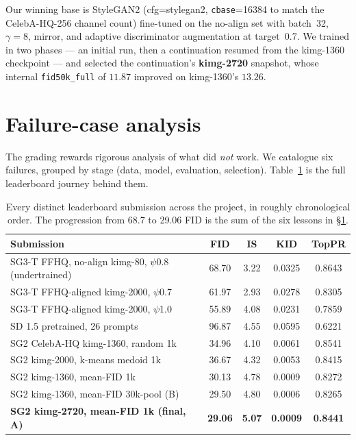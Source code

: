 \documentclass{article}
\begin{document}
Our winning base is StyleGAN2 \citep{karras2020analyzing} (cfg=stylegan2,
\texttt{cbase}=16384 to match the CelebA-HQ-256 channel count) fine-tuned on the
no-align set with batch~32, $\gamma{=}8$, mirror, and adaptive discriminator
augmentation \citep{karras2020training} at target~0.7. We trained in two phases --- an
initial run, then a continuation resumed from the kimg-1360 checkpoint --- and
selected the continuation's \textbf{kimg-2720} snapshot, whose internal
\texttt{fid50k\_full} of $11.87$ improved on kimg-1360's $13.26$.

\section{Failure-case analysis}
\label{sec:failures}
The grading rewards rigorous analysis of what did \emph{not} work. We catalogue
six failures, grouped by stage (data, model, evaluation, selection).
Table~\ref{tab:journey} is the full leaderboard journey behind them.

\begin{table}[h]\centering\small
\begin{tabular}{l c c c c}
\toprule
Submission & FID & IS & KID & TopPR \\
\midrule
SG3-T FFHQ, no-align kimg-80, $\psi$0.8 (undertrained) & 68.70 & 3.22 & 0.0325 & 0.8643 \\
SG3-T FFHQ-aligned kimg-2000, $\psi$0.7              & 61.97 & 2.93 & 0.0278 & 0.8305 \\
SG3-T FFHQ-aligned kimg-2000, $\psi$1.0              & 55.89 & 4.08 & 0.0231 & 0.7859 \\
SD 1.5 pretrained, 26 prompts                        & 96.87 & 4.55 & 0.0595 & 0.6221 \\
SG2 CelebA-HQ kimg-1360, random 1k                   & 34.96 & 4.10 & 0.0061 & 0.8541 \\
SG2 kimg-2000, k-means medoid 1k                     & 36.67 & 4.32 & 0.0053 & 0.8415 \\
SG2 kimg-1360, mean-FID 1k                           & 30.13 & 4.78 & 0.0009 & 0.8272 \\
SG2 kimg-1360, mean-FID 30k-pool (B)                 & 29.50 & 4.80 & 0.0006 & 0.8265 \\
\textbf{SG2 kimg-2720, mean-FID 1k (final, A)}       & \textbf{29.06} & \textbf{5.07} & \textbf{0.0009} & \textbf{0.8441} \\
\bottomrule
\end{tabular}
\caption{Every distinct leaderboard submission across the project, in roughly
chronological order. The progression from 68.7 to 29.06 FID is the sum of the
six lessons in \S\ref{sec:failures}.}
\label{tab:journey}
\end{table}
\end{document}
